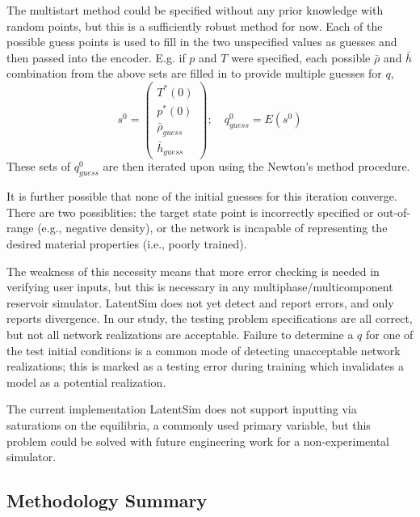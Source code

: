\documentclass[]{article}
\begin{document}
The multistart method could be specified without any prior knowledge
with random points, but this is a sufficiently robust method for
now. Each of the possible guess points is used to fill in the two
unspecified values as guesses and then passed into the encoder.
E.g. if $p$ and $T$ were specified, each possible $\bar{\rho}$ and
$\bar{h}$ combination from the above sets are filled in to provide
multiple guesses for $q$,
\begin{equation}
s^0 = \left(\begin{array}{c}
T^*(0)\\
p^*(0)\\
\bar{\rho}_{guess}\\
\bar{h}_{guess}
\end{array}\right);\quad q^0_{guess}=E\left(s^0\right)
 \end{equation}
 These sets of $q^0_{guess}$ are then iterated upon using the Newton's
 method procedure. 

 It is further possible that none of the initial guesses for this iteration
converge. There are two possiblities: the target state point is
incorrectly specified or out-of-range (e.g., negative density), or the
network is incapable of representing the desired material properties
(i.e., poorly trained). 

The weakness of this necessity means that more error checking is needed
in verifying user inputs, but this is necessary in any
multiphase/multicomponent reservoir simulator. LatentSim does not yet
detect and report errors, and only reports divergence. In our study, the
testing problem specifications are all correct, but not all network
realizations are acceptable. Failure to determine a \(q\) for one of the
test initial conditions is a common mode of detecting unacceptable
network realizations; this is marked as a testing error during training
which invalidates a model as a potential realization.

The current implementation LatentSim does not support inputting via
saturations on the equilibria, a commonly used primary variable, but
this problem could be solved with future engineering work for a
non-experimental simulator.

\hypertarget{header-n3493}{%
\subsection{Methodology Summary}\label{header-n3493}}
\end{document}
